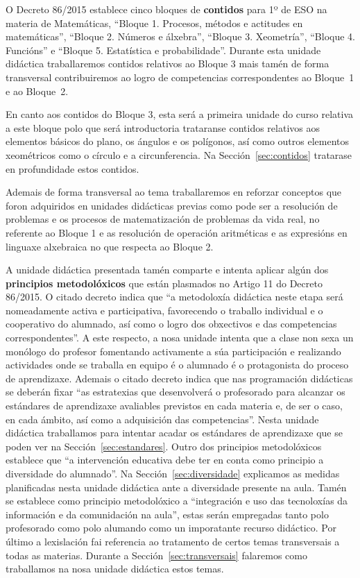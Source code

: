 O Decreto 86/2015 establece cinco bloques de \textbf{contidos} para 1º de ESO na materia de Matemáticas, ``Bloque 1. Procesos, métodos e actitudes en matemáticas'', ``Bloque 2. Números e álxebra'', ``Bloque 3. Xeometría'', ``Bloque 4. Funcións'' e ``Bloque 5. Estatística e probabilidade''. Durante esta unidade didáctica traballaremos contidos relativos ao Bloque 3 mais tamén de forma transversal contribuiremos ao logro de competencias correspondentes ao Bloque~1 e ao Bloque~2.

En canto aos contidos do Bloque 3, esta será a primeira unidade do curso relativa a este bloque polo que será introductoria trataranse contidos relativos aos elementos básicos do plano, os ángulos e os polígonos, así como outros elementos xeométricos como o círculo e a circunferencia. Na Sección~\ref{sec:contidos} tratarase en profundidade estos contidos.

Ademais de forma transversal ao tema traballaremos en reforzar conceptos que foron adquiridos en unidades didácticas previas como pode ser a resolución de problemas e os procesos de matematización de problemas da vida real, no referente ao Bloque 1 e as resolución de operación aritméticas e  as expresións en linguaxe alxebraica no que respecta ao Bloque 2.

A unidade didáctica presentada tamén comparte e intenta aplicar algún dos \textbf{principios metodolóxicos} que están plasmados no Artigo 11 do Decreto 86/2015. O citado decreto indica que ``a metodoloxía didáctica neste etapa será nomeadamente activa e participativa, favorecendo o traballo individual e o cooperativo do alumnado, así como o logro dos obxectivos e das competencias correspondentes''. A este respecto, a nosa unidade intenta que a clase non sexa un monólogo do profesor fomentando activamente a súa participación e realizando actividades onde se traballa en equipo é o alumnado é o protagonista do proceso de aprendizaxe. Ademais o citado decreto indica que nas programación didácticas se deberán fixar ``as estratexias que desenvolverá o profesorado para alcanzar os estándares de aprendizaxe avaliables previstos en cada materia e, de ser o caso, en cada ámbito, así como a adquisición das competencias''. Nesta unidade didáctica traballamos para intentar acadar os estándares de aprendizaxe que se poden ver na Sección~\ref{sec:estandares}. Outro dos principios metodolóxicos establece que ``a intervención educativa debe ter en conta como principio a diversidade do alumnado''. Na Sección~\ref{sec:diversidade} explicamos as medidas planificadas nesta unidade didáctica ante a diversidade presente na aula. Tamén se establece como principio metodolóxico a ``integración e uso das tecnoloxías da información e da comunidación na aula'', estas serán empregadas tanto polo profesorado como polo alumando como un imporatante recurso didáctico. Por último a lexislación fai referencia ao tratamento de certos temas transversais a todas as materias. Durante a Sección~\ref{sec:transversais} falaremos como traballamos na nosa unidade didáctica estos temas.

